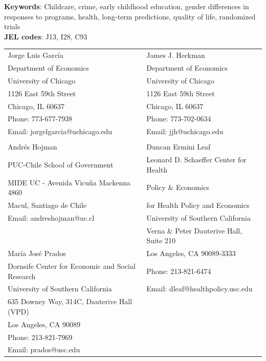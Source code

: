 \noindent \textbf{Keywords}: Childcare, crime, early childhood education, gender differences in responses to programs, health, long-term predictions, quality of life, randomized trials \\
\noindent \textbf{JEL codes}: J13, I28, C93

\bigskip

\begin{tabular}{ll}
Jorge Luis Garc\'{i}a                                       & James J. Heckman \\
Department of Economics                                & Department of Economics \\
University of Chicago                                       & University of Chicago \\
1126 East 59th Street                                     & 1126 East 59th Street \\
Chicago, IL 60637                                           & Chicago, IL 60637 \\
Phone: 773-677-7938                                     & Phone: 773-702-0634  \\
Email: jorgelgarcia@uchicago.edu                       & Email: jjh@uchicago.edu \\
                                                                       & \\
Andr\'{e}s Hojman                                           & Duncan Ermini Leaf \\
PUC-Chile School of Government                        & Leonard D. Schaeffer Center for Health \\
MIDE UC - Avenida Vicu\~{n}a Mackenna 4860   & Policy \& Economics \\
Macul, Santiago de Chile                                    & for Health Policy and Economics \\
Email: andreshojman@uc.cl                                & University of Southern California \\
                                                                       & Verna \& Peter Dauterive Hall, Suite 210 \\
Mar\'{i}a Jos\'{e} Prados                                              & Los Angeles, CA 90089-3333 \\
Dornsife Center for Economic and Social Research          & Phone: 213-821-6474 \\
University of Southern California                         & Email: dleaf@healthpolicy.usc.edu\\
635 Downey Way, 314C, Dauterive Hall (VPD)                                                 \\
Los Angeles, CA 90089 \\
Phone: 213-821-7969 \\
Email: prados@usc.edu
\end{tabular}



